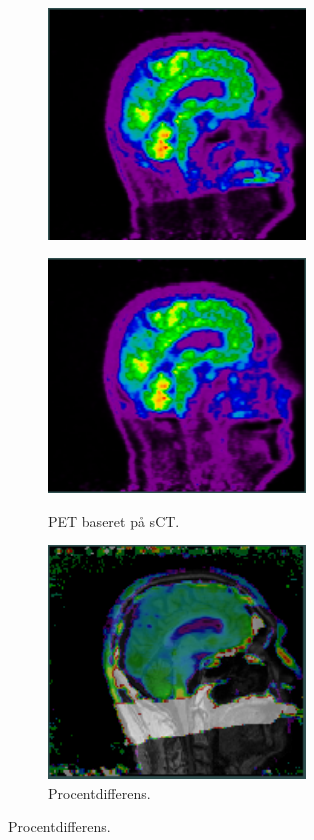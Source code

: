 \begin{figure}
\begin{subfigure}[b]{0.3\textwidth}
        \includegraphics[width=0.75\textwidth]{colager/loocv_pet/loocv_011030_pet_ct.png}
        \label{col:loocv_pet_pat5_ct}
    \end{subfigure}\hfill
    \begin{subfigure}[b]{0.3\textwidth}
        \caption{PET baseret på sCT.}
        \includegraphics[width=0.75\textwidth]{colager/loocv_pet/loocv_011030_pet_sct.png}
        \label{col:loocv_pet_pat5_sct}
    \end{subfigure}\hfill
    \begin{subfigure}[b]{0.3\textwidth}
        \caption{Procentdifferens.}
        \includegraphics[width=0.75\textwidth]{colager/loocv_pet/loocv_011030_pet_pd.png}

\end{subfigure}
\end{figure}

